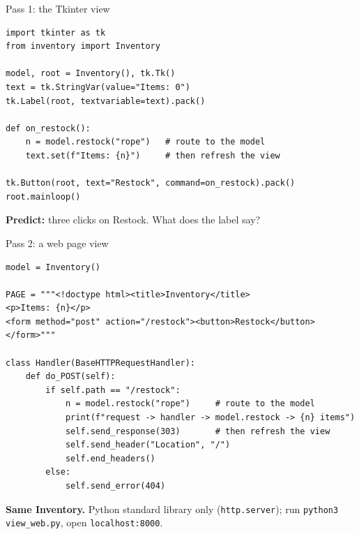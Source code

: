\documentclass[aspectratio=169]{beamer}
\begin{document}
\begin{frame}[fragile]{Pass 1: the Tkinter view}
\predictkicker
\begin{lstlisting}
import tkinter as tk
from inventory import Inventory

model, root = Inventory(), tk.Tk()
text = tk.StringVar(value="Items: 0")
tk.Label(root, textvariable=text).pack()

def on_restock():
    n = model.restock("rope")   # route to the model
    text.set(f"Items: {n}")     # then refresh the view

tk.Button(root, text="Restock", command=on_restock).pack()
root.mainloop()
\end{lstlisting}
  \textbf{Predict:} three clicks on Restock. What does the label say?
\end{frame}

\begin{frame}[fragile]{Pass 2: a web page view}
\begin{lstlisting}
model = Inventory()

PAGE = """<!doctype html><title>Inventory</title>
<p>Items: {n}</p>
<form method="post" action="/restock"><button>Restock</button></form>"""

class Handler(BaseHTTPRequestHandler):
    def do_POST(self):
        if self.path == "/restock":
            n = model.restock("rope")     # route to the model
            print(f"request -> handler -> model.restock -> {n} items")
            self.send_response(303)       # then refresh the view
            self.send_header("Location", "/")
            self.end_headers()
        else:
            self.send_error(404)
\end{lstlisting}
  \textbf{Same Inventory.} Python standard library only (\texttt{http.server}); run \texttt{python3 view\_web.py}, open \texttt{localhost:8000}.
\end{frame}
\end{document}
